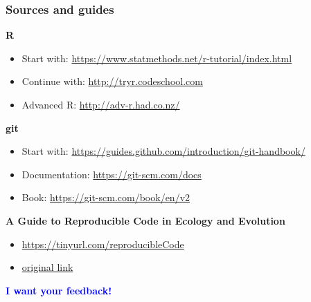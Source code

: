\documentclass[xcolor=dvipsnames,xcolor=table, 14p]{beamer}
\begin{document}
\begin{frame}\frametitle{Sources and guides}
{\Large \bf R}
\begin{itemize}
    \item Start with:  \url{https://www.statmethods.net/r-tutorial/index.html}
    \item Continue with: \url{http://tryr.codeschool.com}
    \item Advanced R: \url{http://adv-r.had.co.nz/}
\end{itemize}
{\Large \bf git}
\begin{itemize}
    \item Start with: \url{https://guides.github.com/introduction/git-handbook/}
    \item Documentation: \url{https://git-scm.com/docs}
    \item Book: \url{https://git-scm.com/book/en/v2}
\end{itemize}
{\large \bf A Guide to Reproducible Code in Ecology and Evolution}
\begin{itemize}
    \item \url{https://tinyurl.com/reproducibleCode}
    \item \href{https://www.britishecologicalsociety.org/wp-content/uploads/2017/12/guide-to-reproducible-code.pdf?fbclid=IwAR00qqChWaXk1o1_gjOtPkcD_y21n3BtLItdM07B8VyjmdrOLAHC6UEk0aQ}{original link}
\end{itemize}
\end{frame}

\begin{frame}{}
    \begin{center}
        \textcolor{blue}{\LARGE \bf I want your feedback!}
    \end{center}
\end{frame}
\end{document}
